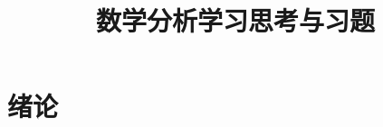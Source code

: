 \documentclass[UTF8,12pt,a4paper,fontset=fandol]{ctexbook}
\title{数学分析学习思考与习题}
\author{}
\date{}
\begin{document}
\maketitle

\frontmatter
\tableofcontents

\chapter{绪论}

\mainmatter

\end{document}
